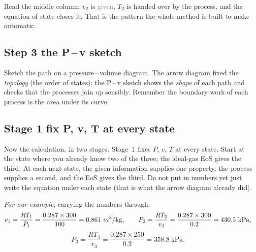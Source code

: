 \documentclass[11pt,a4paper]{article}
\newcommand{\mcube}{{m\textsuperscript{3}}}
\begin{document}
Read the middle column: $v_2$ is \textcolor{gray}{given}, $T_2$ is handed over by
the \textcolor{procred}{process}, and the \textcolor{stateblue}{equation of state}
closes it. That is the pattern the whole method is built to make automatic.

\subsection*{Step 3 \textemdash{} the P\,--\,v sketch}

Sketch the path on a pressure\,--\,volume diagram. The arrow diagram fixed the
\emph{topology} (the order of states); the P\,--\,v sketch shows the \emph{shape}
of each path and checks that the processes join up sensibly. Remember the
boundary work of each process is the area under its curve.

\begin{center}
\end{center}

\subsection*{Stage 1 \textemdash{} fix P, v, T at every state}

Now the calculation, in two stages. Stage~1 fixes $P$, $v$, $T$ at every state.
Start at the state where you already know two of the three; the ideal-gas EoS
gives the third. At each next state, the given information supplies one property,
the process supplies a second, and the EoS gives the third. Do not put in numbers
yet \textemdash{} just write the equation under each state (that is what the arrow
diagram already did).

\emph{For our example}, carrying the numbers through:
\[ v_1 = \frac{RT_1}{P_1} = \frac{0.287\times300}{100} = 0.861~\mcube/\text{kg},
   \qquad
   P_2 = \frac{RT_2}{v_2} = \frac{0.287\times300}{0.2} = 430.5~\text{kPa}, \]
\[ P_3 = \frac{RT_3}{v_3} = \frac{0.287\times250}{0.2} = 358.8~\text{kPa}. \]
\end{document}
